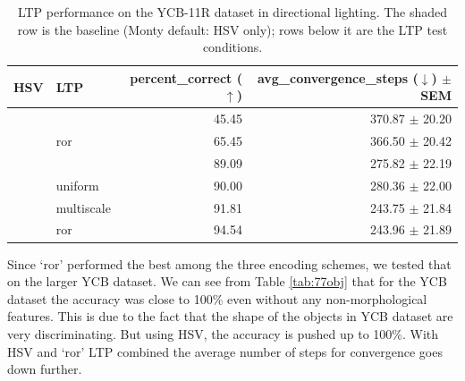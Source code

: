 \documentclass[runningheads]{llncs}
\newcommand{\tickm}{\ding{52}}
\newcommand{\cross}{\ding{56}}
\newcommand{\baserow}{\rowcolor{black!10}}
\begin{document}
\begin{table}
    \vspace{-.5cm}
    \setlength{\tabcolsep}{4pt}
    \renewcommand{\arraystretch}{1.25}
    \vspace{.1cm}
    \centering
    \begin{tabular}{l|l|r|r}
    \hline
    \textbf{HSV} & \textbf{LTP} & \textbf{percent\_correct ($\uparrow$)} & \textbf{avg\_convergence\_steps ($\downarrow$) $\pm$ SEM} \\
    \hline \hline
             \cross & \cross     & 45.45 & 370.87 $\pm$ 20.20\\\hline
             \cross & ror        & 65.45 & 366.50 $\pm$ 20.42\\\hline
    \baserow \tickm & \cross     & 89.09 & 275.82 $\pm$ 22.19\\\hline
             \tickm & uniform    & 90.00 & 280.36 $\pm$ 22.00\\\hline
             \tickm & multiscale & 91.81 & 243.75 $\pm$ 21.84\\\hline
             \tickm & ror        & 94.54 & 243.96 $\pm$ 21.89\\\hline

    \end{tabular}
    \vspace{.1cm}
    \caption{LTP performance on the YCB-11R dataset in directional lighting. The shaded row is the baseline (Monty default: HSV only); rows below it are the LTP test conditions.}
    \label{tab:11retexture}
    \vspace{-1cm}
\end{table}
Since `ror' performed the best among the three encoding schemes, we tested that on the larger YCB dataset. We can see from Table \ref{tab:77obj} that for the YCB dataset the accuracy was close to 100\% even without any non-morphological features. This is due to the fact that the shape of the objects in YCB dataset are very discriminating. But using HSV, the accuracy is pushed up to 100\%. With HSV and `ror' LTP combined the average number of steps for convergence goes down further. 
\end{document}
